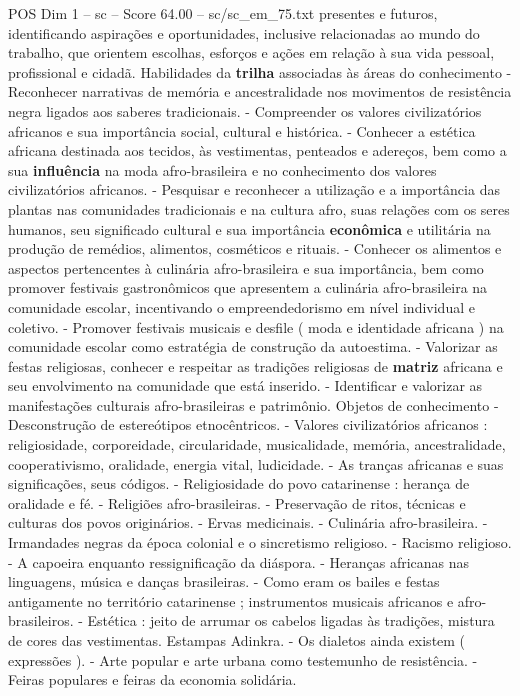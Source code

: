 \begin{textsample}{POS Dim 1 – sc – Score 64.00 – sc/sc\_em\_75.txt}
presentes e futuros, identificando aspirações e oportunidades, inclusive relacionadas ao mundo do trabalho, que orientem escolhas, esforços e ações em relação à sua vida pessoal, profissional e cidadã.
Habilidades da \textbf{trilha} associadas às áreas do conhecimento - Reconhecer narrativas de memória e ancestralidade nos movimentos de resistência negra ligados aos saberes tradicionais. - Compreender os valores civilizatórios africanos e sua importância social, cultural e histórica. - Conhecer a estética africana destinada aos tecidos, às vestimentas, penteados e adereços, bem como a sua \textbf{influência} na moda afro-brasileira e no conhecimento dos valores civilizatórios africanos. - Pesquisar e reconhecer a utilização e a importância das plantas nas comunidades tradicionais e na cultura afro, suas relações com os seres humanos, seu significado cultural e sua importância \textbf{econômica} e utilitária na produção de remédios, alimentos, cosméticos e rituais. - Conhecer os alimentos e aspectos pertencentes à culinária afro-brasileira e sua importância, bem como promover festivais gastronômicos que apresentem a culinária afro-brasileira na comunidade escolar, incentivando o empreendedorismo em nível individual e coletivo. - Promover festivais musicais e desfile ( moda e identidade africana ) na comunidade escolar como estratégia de construção da autoestima. - Valorizar as festas religiosas, conhecer e respeitar as tradições religiosas de \textbf{matriz} africana e seu envolvimento na comunidade que está inserido. - Identificar e valorizar as manifestações culturais afro-brasileiras e patrimônio.
Objetos de conhecimento - Desconstrução de estereótipos etnocêntricos. - Valores civilizatórios africanos : religiosidade, corporeidade, circularidade, musicalidade, memória, ancestralidade, cooperativismo, oralidade, energia vital, ludicidade. - As tranças africanas e suas significações, seus códigos. - Religiosidade do povo catarinense : herança de oralidade e fé. - Religiões afro-brasileiras. - Preservação de ritos, técnicas e culturas dos povos originários. - Ervas medicinais. - Culinária afro-brasileira. - Irmandades negras da época colonial e o sincretismo religioso. - Racismo religioso. - A capoeira enquanto ressignificação da diáspora. - Heranças africanas nas linguagens, música e danças brasileiras. - Como eram os bailes e festas antigamente no território catarinense ; instrumentos musicais africanos e afro-brasileiros. - Estética : jeito de arrumar os cabelos ligadas às tradições, mistura de cores das vestimentas.
Estampas Adinkra. - Os dialetos ainda existem ( expressões ). - Arte popular e arte urbana como testemunho de resistência. - Feiras populares e feiras da economia solidária.

\end{textsample}
